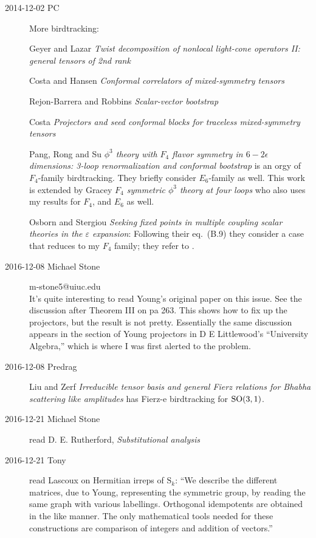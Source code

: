 \begin{description}
\item[2014-12-02 PC] More birdtracking:

Geyer and Lazar
{\em Twist decomposition of nonlocal light-cone operators
{II:} general tensors of 2nd rank}

Costa and Hansen
{\em Conformal correlators of mixed-symmetry tensors}

Rejon-Barrera and Robbins {\em Scalar-vector bootstrap}

Costa \etal{}
{\em Projectors and seed conformal blocks for traceless mixed-symmetry tensors}

Pang, Rong  and Su {\em {$\phi^3$} theory with {$F_4$} flavor
symmetry in {$6-2\epsilon$} dimensions: 3-loop renormalization and conformal
bootstrap} is an orgy of $F_4$-family birdtracking. They briefly consider
$E_6$-family as well.
This work is extended by
Gracey {\em {$F_4$} symmetric {$\phi^3$} theory at four
loops} who also uses my results for $F_4$, and $E_6$ as well.

Osborn and Stergiou {\em Seeking fixed points in multiple
coupling scalar theories in the $\varepsilon$ expansion}:
Following their eq.~(B.9) they consider a case that reduces to my $F_4$
family; they refer to .

\item[2016-12-08 Michael Stone] m-stone5@uiuc.edu
\\
It's quite interesting to read Young's original paper on this
issue. See the discussion after Theorem III on pa 263. This shows how to fix
up the projectors, but the result is not pretty. Essentially the same
discussion appears in the section of Young projectors in D E Littlewood's
``University Algebra,'' which is where I was first alerted to the problem.

\item[2016-12-08 Predrag]
Liu and Zerf {\em Irreducible tensor basis and general {Fierz}
relations for {Bhabha} scattering like amplitudes} has Fierz-e birdtracking for
$\textrm{SO}(3,1)$.

\item[2016-12-21 Michael Stone] read
D. E. Rutherford, {\em Substitutional analysis}

\item[2016-12-21 Tony] read Lascoux on Hermitian irreps of
$\textrm{S}_k$: ``We describe the different matrices, due to Young, representing
the symmetric group, by reading the same graph with various labellings.
Orthogonal idempotents are obtained in the like manner. The only
mathematical tools needed for these constructions are comparison of
integers and addition of vectors.''


\end{description}
